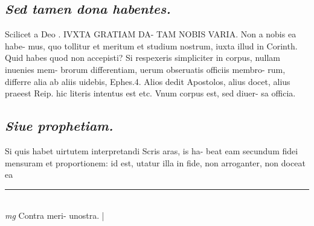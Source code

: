 \documentclass{article}
\begin{document}
\begin{pages}
\subsection*{\textit{Sed tamen dona habentes. }}\pstart Scilicet a Deo . IVXTA GRATIAM DA- TAM NOBIS VARIA. Non a nobis ea habe- mus, quo tollitur et meritum et studium nostrum, iuxta illud in Corinth. Quid habes quod non accepisti? Si respexeris simpliciter in corpus, nullam inuenies mem- brorum differentiam, uerum obseruatis officiis membro- rum, differre alia ab aliis uidebis, Ephes.4. Alios dedit Apostolos, alius docet, alius praeest Reip. hic literis intentus est etc. Vnum corpus est, sed diuer- sa officia.  \pend
{}
{}
\subsection*{\textit{Siue prophetiam. }}\pstart Si quis habet uirtutem interpretandi Scris aras, is ha- beat eam secundum fidei mensuram et proportionem: id est, utatur illa in fide, non arroganter, non doceat ea  \pend
\vspace{0.5cm}\noindent
\vspace{0.2cm}\rule{1cm}{0.2pt}\\ 
\hspace{0.2cm}\textit{mg}
\footnotesize Contra meri- unostra.  
\normalsize| 

\end{pages}
\end{document}
